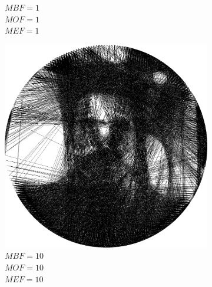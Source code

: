 \begin{figure}[H]
\begin{subfigure}{0.32\textwidth}
        \caption{\(MBF = 1\) \\ \(MOF = 1\) \\ \(MEF = 1\)}
        \label{mine-param-taco-thread-b}
    \end{subfigure}
    \begin{subfigure}{0.32\textwidth}
        \centering
        \includegraphics[width = \textwidth]{img/4-mine/taco-thread/taco_e_i3000_c20_inv0_bg10_obj10_ed10.png}
        \caption{\(MBF = 10\) \\ \(MOF = 10\) \\ \(MEF = 10\)}
        \label{mine-param-taco-thread-c}
    \end{subfigure}\\
    \begin{subfigure}{0.32\textwidth}
        \centering

\end{subfigure}
\end{figure}

